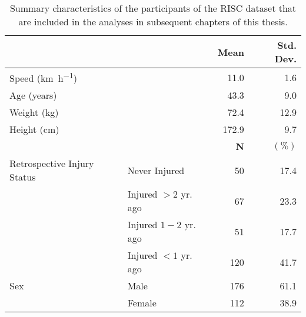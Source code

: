 \begin{table}
\centering
\begin{tabular}[t]{llrr}
\toprule
  &    & \textbf{Mean} & \textbf{Std. Dev.}\\
\midrule
Speed (\si{\km \per \hour}) &  & 11.0 & 1.6\\
Age (years) &  & 43.3 & 9.0\\
Weight (kg) &  & 72.4 & 12.9\\
Height (cm) &  & 172.9 & 9.7\\
\midrule
 &  & \textbf{N} & $\mathbf{\mathbf{(\%)}}$\\
\midrule
Retrospective Injury Status & Never Injured & 50 & 17.4\\
 & Injured $>2$ yr. ago & 67 & 23.3\\
 & Injured $1-2$ yr. ago & 51 & 17.7\\
 & Injured $<1$ yr. ago & 120 & 41.7\\
Sex & Male & 176 & 61.1\\
 & Female & 112 & 38.9\\
\bottomrule
\end{tabular}
\caption{Summary characteristics of the participants of the RISC dataset that are included in the analyses in subsequent chapters of this thesis.}
\label{tab:tab1.}
\end{table}
